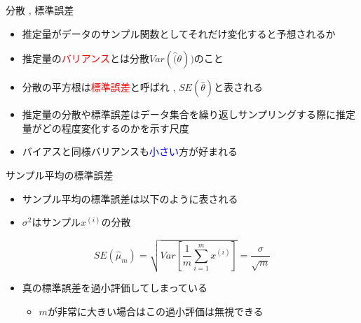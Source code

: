 \documentclass[dvipdfmx, 10pt]{beamer}
\begin{document}
\begin{frame}{分散 , 標準誤差}
  \begin{itemize}
    \item 推定量がデータのサンプル関数としてそれだけ変化すると予想されるか
    \item 推定量の\textcolor{red}{バリアンス}とは分散$Var(\hat(\theta))$のこと
    \item 分散の平方根は\textcolor{red}{標準誤差}と呼ばれ , $SE(\hat{\theta})$と表される
    \item 推定量の分散や標準誤差はデータ集合を繰り返しサンプリングする際に推定量がどの程度変化するのかを示す尺度
    \item バイアスと同様バリアンスも\textcolor{blue}{小さい}方が好まれる
  \end{itemize}
  \begin{exampleblock}{サンプル平均の標準誤差}
    \begin{itemize}
      \item サンプル平均の標準誤差は以下のように表される
      \item $\sigma^{2}$はサンプル$x^{(i)}$の分散
    \end{itemize}
    \begin{equation}
      SE(\hat{\mu}_{m}) = \sqrt{Var \left[ \dfrac{1} {m} \sum_{i=1}^{m} x^{(i)} \right]} = \dfrac{\sigma} {\sqrt{m}}
    \end{equation}
    \begin{itemize}
      \item 真の標準誤差を過小評価してしまっている
      \begin{itemize}
        \item $m$が非常に大きい場合はこの過小評価は無視できる
      \end{itemize}
    \end{itemize}
  \end{exampleblock}
\end{frame}

\end{document}
